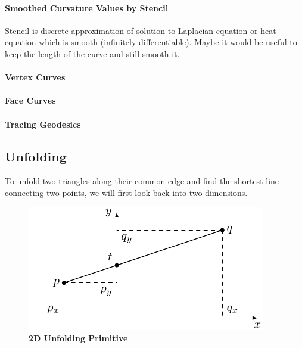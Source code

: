 \documentclass{stdlocal}
\begin{document}
  \paragraph{Smoothed Curvature Values by Stencil}
    Stencil is discrete approximation of solution to Laplacian equation or heat equation which is smooth (infinitely differentiable).
    Maybe it would be useful to keep the length of the curve and still smooth it.
  \paragraph{Vertex Curves}
  \paragraph{Face Curves}
  \paragraph{Tracing Geodesics}

\subsection{Unfolding} %
\label{sub:unfolding}
To unfold two triangles along their common edge and find the shortest line connecting two points, we will first look back into two dimensions.

\begin{figure}[h]
  \centering
  \includegraphics[width=0.6\linewidth]{figures/unfolding_geodesic_2d.pdf}
  \caption[2D Unfolding Primitive]{%
    \textbf{2D Unfolding Primitive}
  }
\end{figure}
\end{document}
